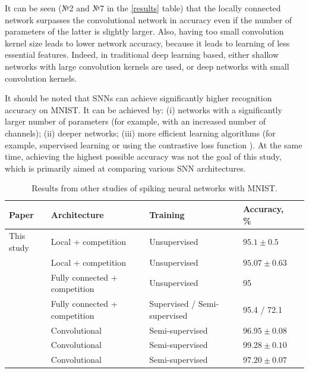 \documentclass[a4paper]{article}
\begin{document}

It can be seen (№2 and №7 in the \ref{results} table) that the locally connected network surpasses the convolutional network in accuracy even if the number of parameters of the latter is slightly larger. Also, having too small convolution kernel size leads to lower network accuracy, because it leads to learning of less essential features. Indeed, in traditional deep learning based, either shallow networks with large convolution kernels are used, or deep networks with small convolution kernels.

It should be noted that SNNs can achieve significantly higher recognition accuracy on MNIST. It can be achieved by: (i) networks with a significantly larger number of parameters (for example, with an increased number of channels); (ii) deeper networks; (iii) more efficient learning algorithms (for example, supervised learning or using the contrastive loss function \cite{contrastive_loss}). At the same time, achieving the highest possible accuracy was not the goal of this study, which is primarily aimed at comparing various SNN architectures.

\begin{table}
 \caption{Results from other studies of spiking neural networks with MNIST.}
\begin{center}
\begin{tabular}{|l|p{4cm}|p{7cm}|l|l|}
\hline
Paper & Architecture & Training & Accuracy, \% \\
\hline\hline
{This study} & {Local + competition} & {Unsupervised} & {$95.1 \pm 0.5$}\\
\hline\hline
{\cite{saunders2019locally}} & {Local + competition} & {Unsupervised} & {$95.07 \pm 0.63$}\\
\hline
{\cite{mnist2}} & {Fully connected + competition} & {Unsupervised} & {95}\\
\hline
{\cite{MaxActiv1}} & {Fully connected + competition} & {Supervised / Semi-supervised} & {95.4 / 72.1}\\
\hline
{\cite{conv1}} & {Convolutional} & {Semi-supervised} & {$96.95 \pm 0.08$}\\
\hline
{\cite{conv2}} & {Convolutional} & {Semi-supervised} & {$99.28 \pm 0.10$}\\
\hline
{\cite{conv3}} & {Convolutional} & {Semi-supervised} & {$97.20 \pm 0.07$}\\
\hline
\end{tabular}
\end{center}
\end{table}
\end{document}
